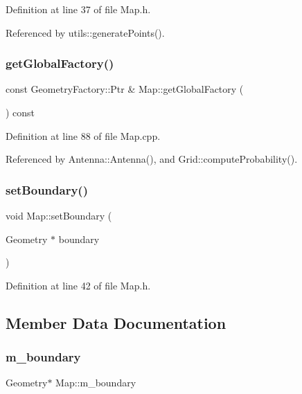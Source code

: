 Definition at line 37 of file Map.\+h.



Referenced by utils\+::generate\+Points().

\mbox{\label{class_map_a6385b465eea96277cde8dc10bf9af014}} 
\subsubsection{get\+Global\+Factory()}
{\footnotesize\ttfamily const Geometry\+Factory\+::\+Ptr \& Map\+::get\+Global\+Factory (\begin{DoxyParamCaption}{ }\end{DoxyParamCaption}) const}



Definition at line 88 of file Map.\+cpp.



Referenced by Antenna\+::\+Antenna(), and Grid\+::compute\+Probability().

\mbox{\label{class_map_acede2ccba9bf0f987f3dde8c332bec17}} 
\subsubsection{set\+Boundary()}
{\footnotesize\ttfamily void Map\+::set\+Boundary (\begin{DoxyParamCaption}\item[{Geometry $\ast$}]{boundary }\end{DoxyParamCaption})\hspace{0.3cm}{\ttfamily [inline]}}



Definition at line 42 of file Map.\+h.



\subsection{Member Data Documentation}
\mbox{\label{class_map_af2c95561cb4ff3b9950240351cf4303c}} 
\subsubsection{m\+\_\+boundary}
{\footnotesize\ttfamily Geometry$\ast$ Map\+::m\+\_\+boundary\hspace{0.3cm}{\ttfamily [private]}}



